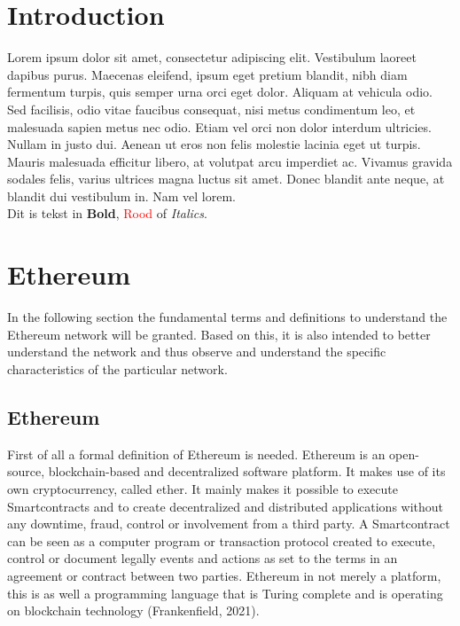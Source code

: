 \documentclass[10pt,a4paper]{article}
\newcommand{\todo}[1]{\textcolor{red}{#1}}
\begin{document}
\begin{multicols}{2}
\section{Introduction}
Lorem ipsum dolor sit amet, consectetur adipiscing elit. Vestibulum laoreet dapibus purus. Maecenas eleifend, ipsum eget pretium blandit, nibh diam fermentum turpis, quis semper urna orci eget dolor. Aliquam at vehicula odio. Sed facilisis, odio vitae faucibus consequat, nisi metus condimentum leo, et malesuada sapien metus nec odio. Etiam vel orci non dolor interdum ultricies. Nullam in justo dui. Aenean ut eros non felis molestie lacinia eget ut turpis. Mauris malesuada efficitur libero, at volutpat arcu imperdiet ac. Vivamus gravida sodales felis, varius ultrices magna luctus sit amet. Donec blandit ante neque, at blandit dui vestibulum in. Nam vel lorem.\\

Dit is tekst in \textbf{Bold}, \todo{Rood} of \textit{Italics}.
\section{Ethereum}

In the following section the fundamental terms and definitions to understand the Ethereum network will be granted. Based on this, it is also intended to better understand the network and thus observe and understand the specific characteristics of the particular network. 

\subsection{Ethereum}
First of all a formal definition of Ethereum is needed. Ethereum is an open-source, blockchain-based and decentralized software platform. It makes use of its own cryptocurrency, called ether. It mainly makes it possible to execute Smartcontracts and to create decentralized and distributed applications without any downtime, fraud, control or involvement from a third party. A Smartcontract can be seen as a computer program or transaction protocol created to execute, control or document legally events and actions as set to the terms in an agreement or contract between two parties. Ethereum in not merely a platform, this is as well a programming language that is Turing complete and is operating on blockchain technology (Frankenfield, 2021). 

\end{multicols}
\end{document}
